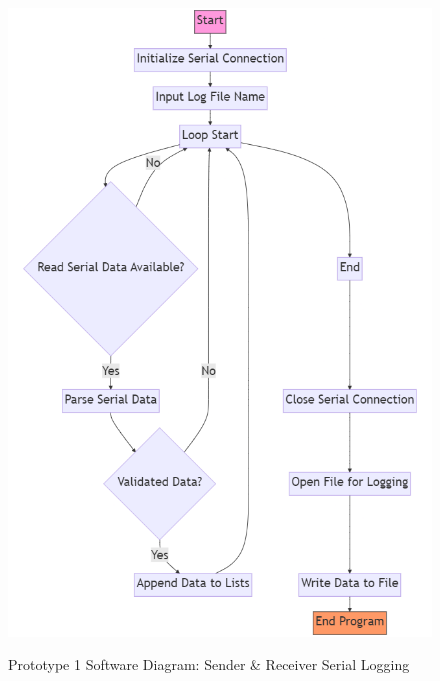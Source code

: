 \begin{figure}[H]
	\centering 
	\caption{Prototype 1 Software Diagram: Sender \& Receiver Serial Logging}
	\includegraphics[width=\textwidth]{Sections/Design-Process/proto1-soft-diagram-sender-log.png}
	\label{proto1-soft-diagram-log}
\end{figure}



